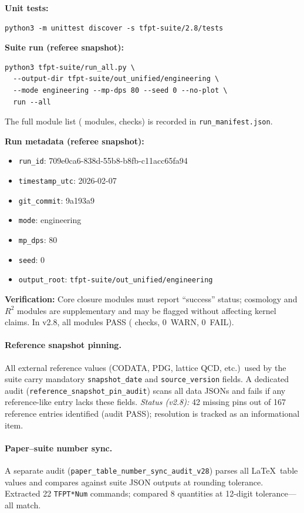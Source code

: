 \textbf{Unit tests:}
\begin{verbatim}
python3 -m unittest discover -s tfpt-suite/2.8/tests
\end{verbatim}

\textbf{Suite run (referee snapshot):}
\begin{verbatim}
python3 tfpt-suite/run_all.py \
  --output-dir tfpt-suite/out_unified/engineering \
  --mode engineering --mp-dps 80 --seed 0 --no-plot \
  run --all
\end{verbatim}
The full module list (\TFPTSuiteModulesTotal{} modules, \TFPTSuiteChecksTotal{} checks) is recorded in \texttt{run\_manifest.json}.

\textbf{Run metadata (referee snapshot):}
\begin{itemize}[leftmargin=1.5em, topsep=2pt, itemsep=1pt]
    \item \texttt{run\_id}: 709e0ca6-838d-55b8-b8fb-c11acc65fa94
    \item \texttt{timestamp\_utc}: 2026-02-07
    \item \texttt{git\_commit}: 9a193a9
    \item \texttt{mode}: engineering
    \item \texttt{mp\_dps}: 80
    \item \texttt{seed}: 0
    \item \texttt{output\_root}: \texttt{tfpt-suite/out\_unified/engineering}
\end{itemize}

\textbf{Verification:} Core closure modules must report ``success'' status; cosmology and $R^2$ modules are supplementary and may be flagged without affecting kernel claims. In v2.8, all \TFPTSuiteModulesTotal{} modules PASS (\TFPTSuiteChecksTotal{} checks, 0~WARN, 0~FAIL).

\paragraph{Reference snapshot pinning.}
All external reference values (CODATA, PDG, lattice QCD, etc.)\ used by the
suite carry mandatory \texttt{snapshot\_date} and \texttt{source\_version} fields.
A dedicated audit (\texttt{reference\_snapshot\_pin\_audit}) scans all data JSONs
and fails if any reference-like entry lacks these fields.
\emph{Status (v2.8):} 42 missing pins out of 167 reference entries identified (audit PASS);
resolution is tracked as an informational item.

\paragraph{Paper--suite number sync.}
A separate audit (\texttt{paper\_table\_number\_sync\_audit\_v28}) parses all
\LaTeX\ table values and compares against suite JSON outputs at rounding tolerance.
Extracted 22 \texttt{TFPT*Num} commands; compared 8 quantities at 12-digit tolerance---all match.

